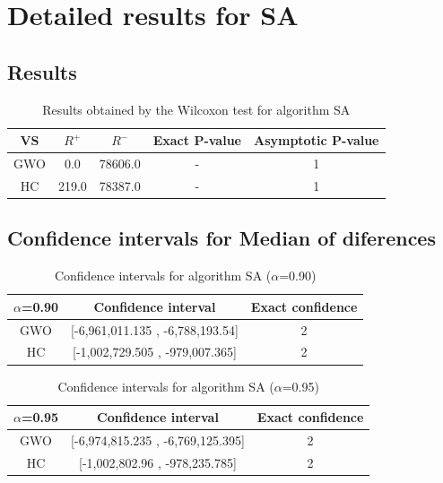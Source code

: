 \documentclass[a4paper,10pt]{article}
\begin{document}
 \clearpage 


\section{Detailed results for SA}


\subsection{Results}

\begin{table}[!htp]
\centering\small
\begin{tabular}{
|c|c|c|c|c|}
\hline
 VS & $R^{+}$ & $R^{-}$ & Exact P-value & Asymptotic P-value \\ \hline 
GWO & 0.0 & 78606.0 & - & 1\\ \hline 
HC & 219.0 & 78387.0 & - & 1\\ \hline 

\end{tabular}
\caption{Results obtained by the Wilcoxon test for algorithm SA}
\end{table}

\subsection{Confidence intervals for Median of diferences}

\begin{table}[!htp]
\centering\small
\begin{tabular}{
|c|c|c|}
\hline
 $\alpha$=0.90 & Confidence interval & Exact confidence \\ \hline 
GWO & [-6,961,011.135 , -6,788,193.54] & 2\\ \hline 
HC & [-1,002,729.505 , -979,007.365] & 2\\ \hline 

\end{tabular}
\caption{Confidence intervals for algorithm SA ($\alpha$=0.90)}
\end{table}
\begin{table}[!htp]
\centering\small
\begin{tabular}{
|c|c|c|}
\hline
 $\alpha$=0.95 & Confidence interval & Exact confidence \\ \hline 
GWO & [-6,974,815.235 , -6,769,125.395] & 2\\ \hline 
HC & [-1,002,802.96 , -978,235.785] & 2\\ \hline 

\end{tabular}
\caption{Confidence intervals for algorithm SA ($\alpha$=0.95)}
\end{table}
\end{document}
